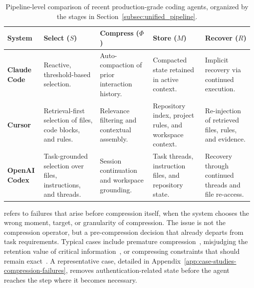 \begin{table}[ht]
\centering
\footnotesize
\setlength{\tabcolsep}{4pt}
\setlength{\aboverulesep}{0.2ex}
\setlength{\belowrulesep}{0.2ex}
\renewcommand{\arraystretch}{0.98}
\begin{tabularx}{\textwidth}{@{}>{\raggedright\arraybackslash}p{2.2cm} >{\raggedright\arraybackslash}X >{\raggedright\arraybackslash}X >{\raggedright\arraybackslash}X >{\raggedright\arraybackslash}X@{}}
\toprule
\textbf{System} & \textbf{Select ($S$)} & \textbf{Compress ($\Phi$)} & \textbf{Store ($M$)} & \textbf{Recover ($R$)} \\
\midrule
\textbf{Claude Code} & Reactive, threshold-based selection. & Auto-compaction of prior interaction history. & Compacted state retained in active context. & Implicit recovery via continued execution. \\
\midrule
\textbf{Cursor} & Retrieval-first selection of files, code blocks, and rules. & Relevance filtering and contextual assembly. & Repository index, project rules, and workspace context. & Re-injection of retrieved files, rules, and evidence. \\
\midrule
\textbf{OpenAI Codex} & Task-grounded selection over files, instructions, and threads. & Session continuation and workspace grounding. & Task threads, instruction files, and repository state. & Recovery through continued threads and file re-access. \\
\bottomrule
\end{tabularx}
\vspace{-.2cm}
\caption{Pipeline-level comparison of recent production-grade coding agents, organized by the stages in Section~\ref{subsec:unified_pipeline}.}
\label{tab:coding_agents_pipeline}
\vspace{-.4cm}
\end{table}

\noindent\textbf{\fone} refers to failures that arise before compression itself, when the system chooses the wrong moment, target, or granularity of compression. The issue is not the compression operator, but a pre-compression decision that already departs from task requirements. Typical cases include premature compression~\citep{yang2026staticsummarizationproactivememory, liu2025contexttoolcontextmanagement}, misjudging the retention value of critical information~\citep{liang2026learningremembermetacognitivemanagement, feng2026agentocrreimaginingagenthistory}, or compressing constraints that should remain exact~\citep{liu2025contexttoolcontextmanagement}. A representative case, detailed in Appendix~\ref{app:case-studies-compression-failures}, removes authentication-related state before the agent reaches the step where it becomes necessary.

